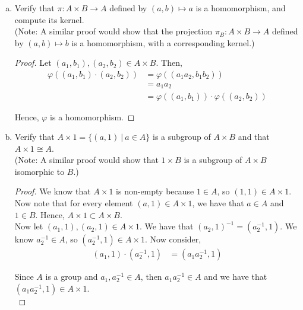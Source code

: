 \documentclass[11pt, reqno]{amsart}
\theoremstyle{plain}
\theoremstyle{definition}
\theoremstyle{example}
\begin{document}
\begin{enumerate}[1.]
\begin{enumerate}[(a)]
\begin{proof}
and,
\begin{align*}
(a_1, b_1) \cdot (a_1, b_1)^{-1} &= (a_1, b_1) \cdot (a_1^{-1}, b_1^{-1})\\
&= (a_1a_1^{-1}, b_1b_1^{-1})\\
&= (1, 1)
\end{align*}

Hence, $A \times B$ is a group.
\end{proof}

\item Verify that $\pi: A \times B \to A$ defined by $(a,b) \mapsto a$ is a homomorphism, and compute its kernel.\\
(Note: A similar proof would show that  the projection $\pi_B: A \times B \to A$ defined by $(a,b) \mapsto b$ is a homomorphism, with a corresponding kernel.)
\begin{proof}
Let $(a_1, b_1), (a_2, b_2) \in A \times B$. Then,
\begin{align*}
\varphi((a_1, b_1) \cdot (a_2, b_2)) &= \varphi((a_1a_2, b_1b_2))\\
&= a_1a_2\\
&= \varphi((a_1, b_1)) \cdot \varphi((a_2, b_2))
\end{align*}

Hence, $\varphi$ is a homomorphism.
\end{proof}

\item Verify that $A \times 1 = \{(a,1) ~|~ a \in A\}$ is a subgroup of $A \times B$ and that $A \times 1 \cong A$. \\
(Note: A similar proof would show that  $1 \times B$ is a  subgroup of $A \times B$ isomorphic to $B$.)
\begin{proof}
We know that $A \times 1$ is non-empty because $1 \in A$, so $(1, 1) \in A \times 1$.\\

Now note that for every element $(a, 1) \in A \times 1$, we have that $a \in A$ and $1 \in B$. Hence, $A \times 1 \subset A \times B$.\\

Now let $(a_1, 1), (a_2, 1) \in A \times 1$. We have that $(a_2, 1)^{-1} = (a_2^{-1}, 1)$. We know $a_2^{-1} \in A$, so $(a_2^{-1}, 1) \in A \times 1$. Now consider,
\begin{align*}
(a_1, 1) \cdot (a_2^{-1}, 1) &= (a_1a_2^{-1}, 1)
\end{align*}

Since $A$ is a group and $a_1, a_2^{-1} \in A$, then $a_1a_2^{-1} \in A$ and we have that $(a_1a_2^{-1}, 1) \in A \times 1$.\\


\end{proof}
\end{enumerate}
\end{enumerate}
\end{document}
